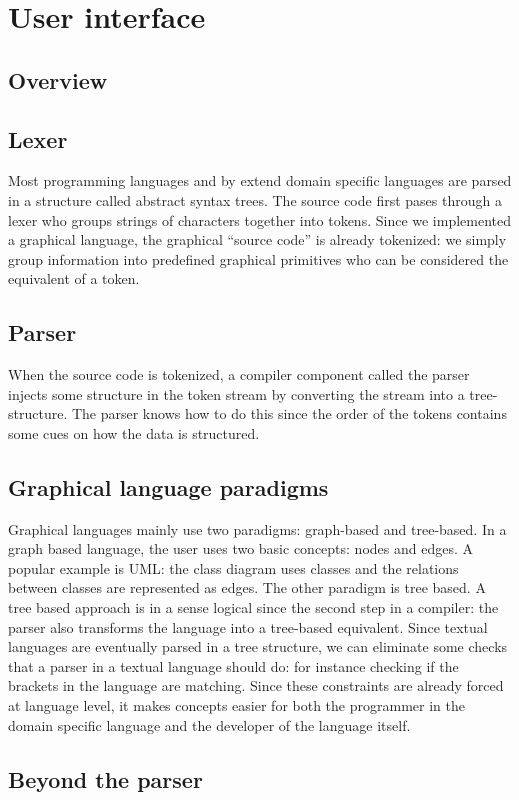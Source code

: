 \section{User interface}
\subsection{Overview}
\subsection{Lexer}
Most programming languages and by extend domain specific languages are parsed
in a structure called abstract syntax trees. The source code first pases
through a lexer who groups strings of characters together into tokens. Since we
implemented a graphical language, the graphical ``source code'' is already
tokenized: we simply group information into predefined graphical primitives who
can be considered the equivalent of a token.
\subsection{Parser}
When the source code is tokenized, a compiler component called the parser
injects some structure in the token stream by converting the stream into a
tree-structure. The parser knows how to do this since the order of the tokens
contains some cues on how the data is structured.
\subsection{Graphical language paradigms}
Graphical languages mainly use two paradigms: graph-based and tree-based. In a
graph based language, the user uses two basic concepts: nodes and edges. A
popular example is UML: the class diagram uses classes and the relations
between classes are represented as edges. The other paradigm is tree based. A
tree based approach is in a sense logical since the second step in a compiler:
the parser also transforms the language into a tree-based equivalent. Since
textual languages are eventually parsed in a tree structure, we can eliminate
some checks that a parser in a textual language should do: for instance
checking if the brackets in the language are matching. Since these constraints
are already forced at language level, it makes concepts easier for both the
programmer in the domain specific language and the developer of the language
itself.
\subsection{Beyond the parser}
